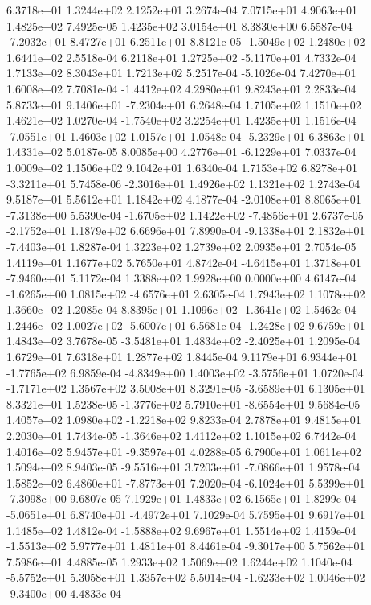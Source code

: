 6.3718e+01 1.3244e+02 2.1252e+01  3.2674e-04
7.0715e+01 4.9063e+01 1.4825e+02  7.4925e-05
1.4235e+02 3.0154e+01 8.3830e+00  6.5587e-04
-7.2032e+01  8.4727e+01  6.2511e+01  8.8121e-05
-1.5049e+02  1.2480e+02  1.6441e+02  2.5518e-04
 6.2118e+01  1.2725e+02 -5.1170e+01  4.7332e-04
1.7133e+02 8.3043e+01 1.7213e+02  5.2517e-04
-5.1026e-04  7.4270e+01  1.6008e+02  7.7081e-04
-1.4412e+02  4.2980e+01  9.8243e+01  2.2833e-04
 5.8733e+01  9.1406e+01 -7.2304e+01  6.2648e-04
1.7105e+02 1.1510e+02 1.4621e+02  1.0270e-04
-1.7540e+02  3.2254e+01  1.4235e+01  1.1516e-04
-7.0551e+01  1.4603e+02  1.0157e+01  1.0548e-04
-5.2329e+01  6.3863e+01  1.4331e+02  5.0187e-05
 8.0085e+00  4.2776e+01 -6.1229e+01  7.0337e-04
1.0009e+02 1.1506e+02 9.1042e+01  1.6340e-04
 1.7153e+02  6.8278e+01 -3.3211e+01  5.7458e-06
-2.3016e+01  1.4926e+02  1.1321e+02  1.2743e-04
9.5187e+01 5.5612e+01 1.1842e+02  4.1877e-04
-2.0108e+01  8.8065e+01 -7.3138e+00  5.5390e-04
-1.6705e+02  1.1422e+02 -7.4856e+01  2.6737e-05
-2.1752e+01  1.1879e+02  6.6696e+01  7.8990e-04
-9.1338e+01  2.1832e+01 -7.4403e+01  1.8287e-04
1.3223e+02 1.2739e+02 2.0935e+01  2.7054e-05
1.4119e+01 1.1677e+02 5.7650e+01  4.8742e-04
-4.6415e+01  1.3718e+01 -7.9460e+01  5.1172e-04
1.3388e+02 1.9928e+00 0.0000e+00  4.6147e-04
-1.6265e+00  1.0815e+02 -4.6576e+01  2.6305e-04
1.7943e+02 1.1078e+02 1.3660e+02  1.2085e-04
 8.8395e+01  1.1096e+02 -1.3641e+02  1.5462e-04
 1.2446e+02  1.0027e+02 -5.6007e+01  6.5681e-04
-1.2428e+02  9.6759e+01  1.4843e+02  3.7678e-05
-3.5481e+01  1.4834e+02 -2.4025e+01  1.2095e-04
1.6729e+01 7.6318e+01 1.2877e+02  1.8445e-04
 9.1179e+01  6.9344e+01 -1.7765e+02  6.9859e-04
-4.8349e+00  1.4003e+02 -3.5756e+01  1.0720e-04
-1.7171e+02  1.3567e+02  3.5008e+01  8.3291e-05
-3.6589e+01  6.1305e+01  8.3321e+01  1.5238e-05
-1.3776e+02  5.7910e+01 -8.6554e+01  9.5684e-05
 1.4057e+02  1.0980e+02 -1.2218e+02  9.8233e-04
2.7878e+01 9.4815e+01 2.2030e+01  1.7434e-05
-1.3646e+02  1.4112e+02  1.1015e+02  6.7442e-04
 1.4016e+02  5.9457e+01 -9.3597e+01  4.0288e-05
6.7900e+01 1.0611e+02 1.5094e+02  8.9403e-05
-9.5516e+01  3.7203e+01 -7.0866e+01  1.9578e-04
 1.5852e+02  6.4860e+01 -7.8773e+01  7.2020e-04
-6.1024e+01  5.5399e+01 -7.3098e+00  9.6807e-05
7.1929e+01 1.4833e+02 6.1565e+01  1.8299e-04
-5.0651e+01  6.8740e+01 -4.4972e+01  7.1029e-04
5.7595e+01 9.6917e+01 1.1485e+02  1.4812e-04
-1.5888e+02  9.6967e+01  1.5514e+02  1.4159e-04
-1.5513e+02  5.9777e+01  1.4811e+01  8.4461e-04
-9.3017e+00  5.7562e+01  7.5986e+01  4.4885e-05
1.2933e+02 1.5069e+02 1.6244e+02  1.1040e-04
-5.5752e+01  5.3058e+01  1.3357e+02  5.5014e-04
-1.6233e+02  1.0046e+02 -9.3400e+00  4.4833e-04

